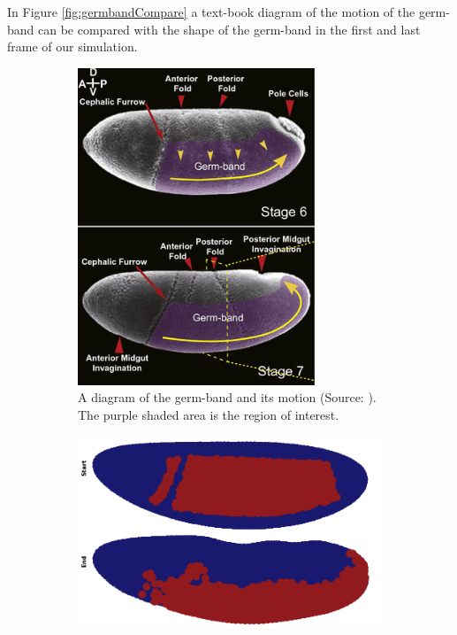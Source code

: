 In Figure \ref{fig:germbandCompare} a text-book diagram of the motion of the germ-band can be compared with the shape of the germ-band in the first and last frame of our simulation. 
\begin{figure}[H]
    \centering
    \begin{subfigure}[b]{0.3\textwidth}
        \includegraphics[width=\textwidth]{chapters/Results/figures/compareGB.png}
    \caption{A diagram of the germ-band and its motion (Source: ). The purple shaded area is the region of interest. }
    \end{subfigure}
    \begin{subfigure}[b]{0.61\textwidth}
    \includegraphics[width=\textwidth]{chapters/Results/figures/gb_firstframe_lastframe.png}

\end{subfigure}
\end{figure}
